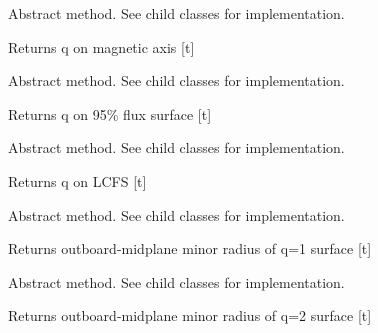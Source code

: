 \documentclass[letterpaper,10pt,english]{sphinxmanual}
\begin{document}
\begin{fulllineitems}
\begin{fulllineitems}
\label{eqtools:eqtools.core.Equilibrium.getQ0}
Abstract method.  See child classes for implementation.

Returns q on magnetic axis {[}t{]}

\end{fulllineitems}


\begin{fulllineitems}
\label{eqtools:eqtools.core.Equilibrium.getQ95}
Abstract method.  See child classes for implementation.

Returns q on 95\% flux surface {[}t{]}

\end{fulllineitems}


\begin{fulllineitems}
\label{eqtools:eqtools.core.Equilibrium.getQLCFS}
Abstract method.  See child classes for implementation.

Returns q on LCFS {[}t{]}

\end{fulllineitems}


\begin{fulllineitems}
\label{eqtools:eqtools.core.Equilibrium.getQ1Surf}
Abstract method.  See child classes for implementation.

Returns outboard-midplane minor radius of q=1 surface {[}t{]}

\end{fulllineitems}


\begin{fulllineitems}
\label{eqtools:eqtools.core.Equilibrium.getQ2Surf}
Abstract method.  See child classes for implementation.

Returns outboard-midplane minor radius of q=2 surface {[}t{]}

\end{fulllineitems}


\end{fulllineitems}
\end{document}
